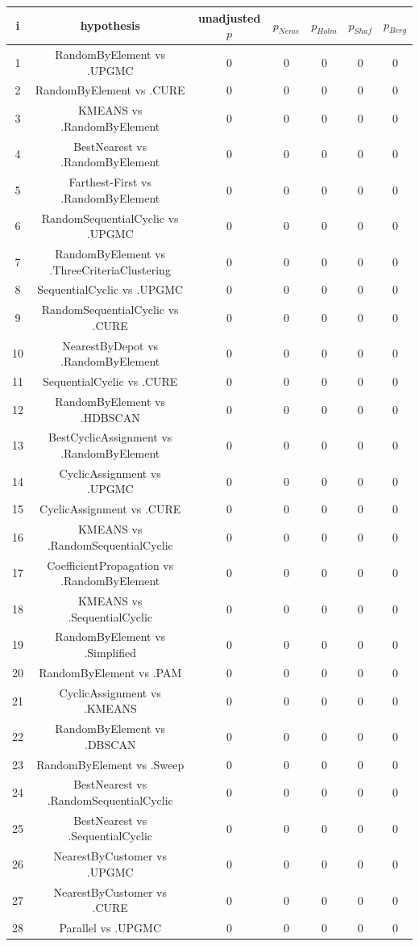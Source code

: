 \documentclass[a4paper,10pt]{article}
\begin{document}
\begin{landscape}
\begin{table}[!htp]
\centering\scriptsize
\begin{tabular}{ccccccc}
i&hypothesis&unadjusted $p$&$p_{Neme}$&$p_{Holm}$&$p_{Shaf}$&$p_{Berg}$\\
\hline1&RandomByElement vs .UPGMC&0&0&0&0&0\\
2&RandomByElement vs .CURE&0&0&0&0&0\\
3&KMEANS vs .RandomByElement&0&0&0&0&0\\
4&BestNearest vs .RandomByElement&0&0&0&0&0\\
5&Farthest-First vs .RandomByElement&0&0&0&0&0\\
6&RandomSequentialCyclic vs .UPGMC&0&0&0&0&0\\
7&RandomByElement vs .ThreeCriteriaClustering&0&0&0&0&0\\
8&SequentialCyclic vs .UPGMC&0&0&0&0&0\\
9&RandomSequentialCyclic vs .CURE&0&0&0&0&0\\
10&NearestByDepot vs .RandomByElement&0&0&0&0&0\\
11&SequentialCyclic vs .CURE&0&0&0&0&0\\
12&RandomByElement vs .HDBSCAN&0&0&0&0&0\\
13&BestCyclicAssignment vs .RandomByElement&0&0&0&0&0\\
14&CyclicAssignment vs .UPGMC&0&0&0&0&0\\
15&CyclicAssignment vs .CURE&0&0&0&0&0\\
16&KMEANS vs .RandomSequentialCyclic&0&0&0&0&0\\
17&CoefficientPropagation vs .RandomByElement&0&0&0&0&0\\
18&KMEANS vs .SequentialCyclic&0&0&0&0&0\\
19&RandomByElement vs .Simplified&0&0&0&0&0\\
20&RandomByElement vs .PAM&0&0&0&0&0\\
21&CyclicAssignment vs .KMEANS&0&0&0&0&0\\
22&RandomByElement vs .DBSCAN&0&0&0&0&0\\
23&RandomByElement vs .Sweep&0&0&0&0&0\\
24&BestNearest vs .RandomSequentialCyclic&0&0&0&0&0\\
25&BestNearest vs .SequentialCyclic&0&0&0&0&0\\
26&NearestByCustomer vs .UPGMC&0&0&0&0&0\\
27&NearestByCustomer vs .CURE&0&0&0&0&0\\
28&Parallel vs .UPGMC&0&0&0&0&0\\

\end{tabular}
\end{table}
\end{landscape}
\end{document}
